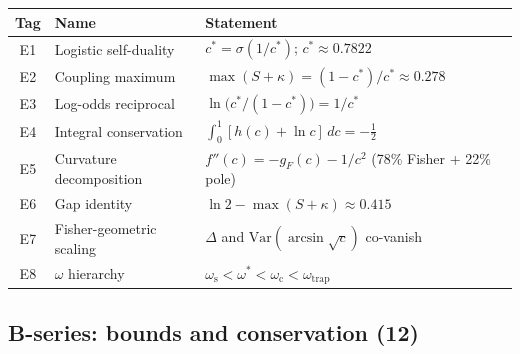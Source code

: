 \documentclass[
  aps,
  prd,
  twocolumn,
  superscriptaddress,
  nofootinbib,
  floatfix
]{revtex4-2}
\newcommand{\gF}{g_{\!F}}
\begin{document}
{\small
\begin{center}
\begin{tabular}{@{}clP{3.5cm}@{}}
\toprule
Tag & Name & Statement \\
\midrule
E1 & Logistic self-duality &
  $c^* = \sigma(1/c^*)$; $c^* \approx 0.7822$ \\
E2 & Coupling maximum &
  $\max(S{+}\kappa) = (1{-}c^*)/c^* \approx 0.278$ \\
E3 & Log-odds reciprocal &
  $\ln\!\bigl(c^*/(1{-}c^*)\bigr) = 1/c^*$ \\
E4 & Integral conservation &
  $\int_0^1 [h(c){+}\ln c]\,dc = -\tfrac{1}{2}$ \\
E5 & Curvature decomposition &
  $f''(c) = -\gF(c) - 1/c^2$ (78\% Fisher + 22\% pole) \\
E6 & Gap identity &
  $\ln 2 - \max(S{+}\kappa) \approx 0.415$ \\
E7 & Fisher-geometric scaling &
  $\Delta$ and $\mathrm{Var}(\arcsin\sqrt{c})$ co-vanish \\
E8 & $\omega$ hierarchy &
  $\omega_\mathrm{s} < \omega^* < \omega_\mathrm{c}
    < \omega_\mathrm{trap}$ \\
\bottomrule
\end{tabular}
\end{center}}

\subsection{B-series: bounds and conservation (12)}
\end{document}
